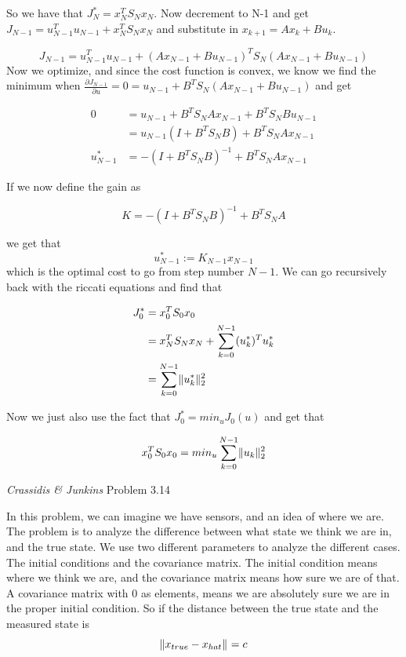 \documentclass[12pt,A4, onecolumn]{exam}
\DeclarePairedDelimiter{\norm}{\lVert}{\rVert}
\begin{document}
\begin{questions}
\begin{solution}
  So we have that $ J_N^* = x_N^T S_N x_N $. Now decrement to N-1 and get $ J_{N-1} = u_{N-1}^Tu_{N-1} + x_N^TS_N x_N $ and substitute in $ x_{k+1} = Ax_k + Bu_k $.

  \[
      J_{N-1} = u_{N-1}^Tu_{N-1} + \left( Ax_{N-1} + Bu_{N-1} \right) ^TS_N \left( Ax_{N-1} + Bu_{N-1} \right)  
  \]
  Now we optimize, and since the cost function is convex, we know we find the minimum when $ \frac{ \partial J_{N-1} }{ \partial u } = 0 = u_{N-1} + B^T S_N \left( Ax_{N-1} + Bu_{N-1} \right)  $ and get

  \begin{align*}
    0 &= u_{N-1} + B^T S_N Ax_{N-1} + B^T S_N Bu_{N-1} \\
    &= u_{N-1} \left( I + B^TS_NB \right) + B^TS_N Ax_{N-1} \\
    u_{N-1}^* &= -\left( I + B^TS_NB \right)^{-1} + B^TS_N Ax_{N-1}
  \end{align*}

  If we now define the gain as 

  \[
      K = -\left( I + B^TS_NB \right)^{-1} + B^TS_N A
  \]

  we get that \[
      u_{N-1}^* := K_{N-1} x_{N-1} 
  \]
  which is the optimal cost to go from step number $ N-1 $. We can go recursively back with the riccati equations and find that 
  
\begin{align*}
  J_0^* &= x_0^TS_0x_0\\
  &= x_N^TS_Nx_N  + \sum_{ k=0 }^{ N-1 } (u_k^*)^T u_k^*\\
  &= \sum_{ k=0}^{ N-1 } \norm{u_k^*}_{2}^{2}
\end{align*}

Now we just also use the fact that $ J_0^* = min_u J_0(u) $  and get that

\[
    x_0^TS_0x_0 = min_u \sum_{ k=0 }^{ N-1 } \norm{u_k}_{2}^{2} 
\]
  
  
  

\end{solution}

 \question[10] \textit{Crassidis \& Junkins} Problem 3.14
\begin{solution}
  In this problem, we can imagine we have sensors, and an idea of where we are. The problem is to analyze the difference between what state we think we are in, and the true state. We use two different parameters to analyze the different cases. The initial conditions and the covariance matrix. The initial condition means where we think we are, and the covariance matrix means how sure we are of that. A covariance matrix with 0 as elements, means we are absolutely sure we are in the proper initial condition. So if the distance between the true state and the measured state is 
  \[
     \norm{x_{true} - x_{hat}}_{}^{} = c
  \] 


\end{solution}
\end{questions}
\end{document}
